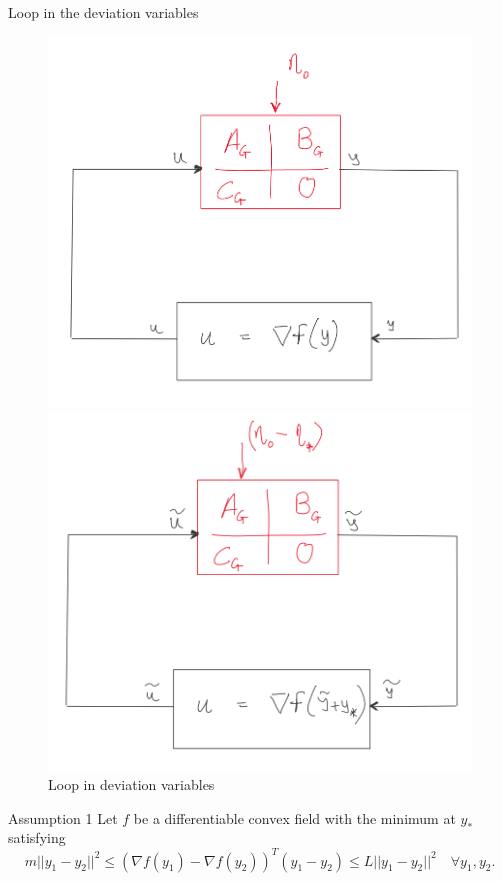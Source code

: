 \documentclass{beamer}
\begin{document}
\begin{frame}{Loop in the deviation variables}
	\begin{figure}[!htb]
		\centering
		\begin{minipage}{.5\textwidth}
			\centering
			\includegraphics[width=0.8\linewidth,height=0.45\textheight]{figures/loop.PNG}
			\caption{Original loop}
			\label{fig:prob1_6_2}
		\end{minipage}%
		\begin{minipage}{0.5\textwidth}
			\centering
			\includegraphics[width=0.8\linewidth,height=0.45\textheight]{figures/loop_dev_vars.PNG}
			\caption{Loop in deviation variables}
			\label{fig:prob1_6_1}
		\end{minipage}
	\end{figure}
\begin{block}{Assumption 1}
	Let $f$ be a differentiable convex field with the minimum at $y_*$ satisfying
	\begin{equation*}
		m||y_1-y_2||^2 \leq  (\nabla f(y_1)-\nabla f(y_2))^T(y_1-y_2) \leq L ||y_1-y_2||^2 \quad \forall y_1,y_2.
	\end{equation*}
	
\end{block}
\end{frame}
\end{document}
